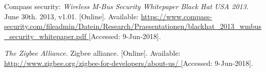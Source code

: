 \begin{thebibliography}{9}

Compass security:
\textit{
Wireless M-Bus Security Whitepaper Black Hat USA 2013.
}
June 30th. 2013, v1.01.
[Online]. Available:
\url{
https://www.compass-security.com/fileadmin/Datein/Research/Praesentationen/blackhat_2013_wmbus_security_whitepaper.pdf
}
[Accessed: 9-Jun-2018].












\textit{
The Zigbee Alliance.
}
Zigbee alliance.
[Online]. Available:
\url{
http://www.zigbee.org/zigbee-for-developers/about-us/
}
[Accessed: 9-Jun-2018].










\end{thebibliography}
